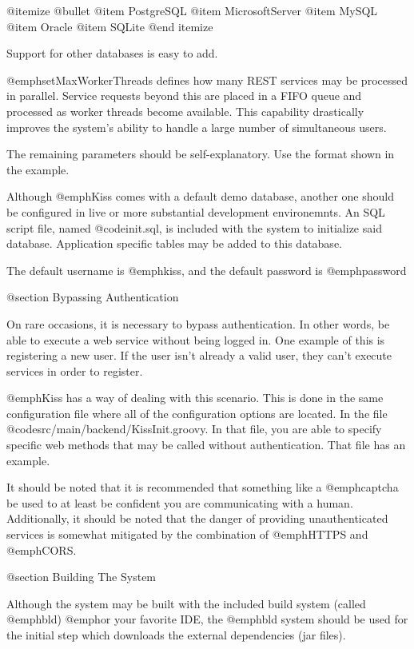 @itemize @bullet
@item
PostgreSQL
@item
MicrosoftServer
@item
MySQL
@item
Oracle
@item
SQLite
@end itemize

Support for other databases is easy to add.

@emph{setMaxWorkerThreads} defines how many REST services may be
processed in parallel.  Service requests beyond this are placed in a
FIFO queue and processed as worker threads become available.  This
capability drastically improves the system's ability to handle a large
number of simultaneous users.

The remaining parameters should be self-explanatory.  Use the format
shown in the example.

Although @emph{Kiss} comes with a default demo database, another one
should be configured in live or more substantial development
environemnts.  An SQL script file, named @code{init.sql}, is included
with the system to initialize said database.  Application specific tables
may be added to this database.

The default username is @emph{kiss}, and the default password is
@emph{password}

@section Bypassing Authentication

On rare occasions, it is necessary to bypass authentication.  In other
words, be able to execute a web service without being logged in.  One
example of this is registering a new user.  If the user isn't already a
valid user, they can't execute services in order to register.

@emph{Kiss} has a way of dealing with this scenario.  This is done in
the same configuration file where all of the configuration options are
located.  In the file @code{src/main/backend/KissInit.groovy}.  In
that file, you are able to specify specific web methods that may be
called without authentication.  That file has an example.

It should be noted that it is recommended that something like a
@emph{captcha} be used to at least be confident you are
communicating with a human.  Additionally, it should be noted that the
danger of providing unauthenticated services is somewhat mitigated by
the combination of @emph{HTTPS} and @emph{CORS}.

@section Building The System

Although the system may be built with the included build system
(called @emph{bld}) @emph{or} your favorite IDE, the @emph{bld}
system should be used for the initial step which downloads the external
dependencies (jar files).


